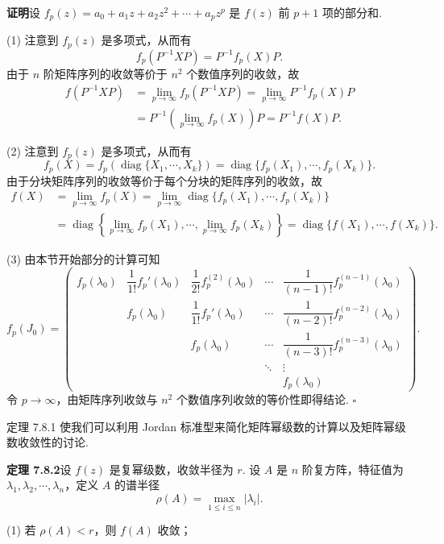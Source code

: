 \documentclass[UTF8, 12pt, fontset=fandol, oneside]{ctexart}
\begin{document}
\noindent\textbf{证明}\quad 设 $f_p(z)=a_0+a_1z+a_2z^2+\cdots+a_pz^p$ 是 $f(z)$ 前 $p+1$ 项的部分和.

(1) 注意到 $f_p(z)$ 是多项式，从而有
\[
f_p(P^{-1}XP)=P^{-1}f_p(X)P.
\]
由于 $n$ 阶矩阵序列的收敛等价于 $n^2$ 个数值序列的收敛，故
\[
\begin{aligned}
f(P^{-1}XP)&=\lim_{p\to\infty}f_p(P^{-1}XP)=\lim_{p\to\infty}P^{-1}f_p(X)P\\
&=P^{-1}\left(\lim_{p\to\infty}f_p(X)\right)P=P^{-1}f(X)P.
\end{aligned}
\]

(2) 注意到 $f_p(z)$ 是多项式，从而有
\[
f_p(X)=f_p(\operatorname{diag}\{X_1,\cdots,X_k\})=\operatorname{diag}\{f_p(X_1),\cdots,f_p(X_k)\}.
\]
由于分块矩阵序列的收敛等价于每个分块的矩阵序列的收敛，故
\[
\begin{aligned}
f(X)&=\lim_{p\to\infty}f_p(X)=\lim_{p\to\infty}\operatorname{diag}\{f_p(X_1),\cdots,f_p(X_k)\}\\
&=\operatorname{diag}\left\{\lim_{p\to\infty}f_p(X_1),\cdots,\lim_{p\to\infty}f_p(X_k)\right\}=\operatorname{diag}\{f(X_1),\cdots,f(X_k)\}.
\end{aligned}
\]

(3) 由本节开始部分的计算可知
\begin{equation}
f_p(J_0)=\left(\begin{array}{ccccc}
f_p(\lambda_0) & \dfrac1{1!}f_p'(\lambda_0) & \dfrac1{2!}f_p^{(2)}(\lambda_0) & \cdots & \dfrac1{(n-1)!}f_p^{(n-1)}(\lambda_0)\\
& f_p(\lambda_0) & \dfrac1{1!}f_p'(\lambda_0) & \cdots & \dfrac1{(n-2)!}f_p^{(n-2)}(\lambda_0)\\
& & f_p(\lambda_0) & \cdots & \dfrac1{(n-3)!}f_p^{(n-3)}(\lambda_0)\\
& & & \ddots & \vdots\\
& & & & f_p(\lambda_0)
\end{array}\right).
\tag{7.8.5}
\end{equation}
令 $p\to\infty$，由矩阵序列收敛与 $n^2$ 个数值序列收敛的等价性即得结论. $\square$

定理 7.8.1 使我们可以利用 Jordan 标准型来简化矩阵幂级数的计算以及矩阵幂级数收敛性的讨论.

\noindent\textbf{定理 7.8.2}\quad 设 $f(z)$ 是复幂级数，收敛半径为 $r$. 设 $A$ 是 $n$ 阶复方阵，特征值为 $\lambda_1,\lambda_2,\cdots,\lambda_n$，定义 $A$ 的谱半径
\[
\rho(A)=\max_{1\leq i\leq n}|\lambda_i|.
\]

(1) 若 $\rho(A)<r$，则 $f(A)$ 收敛；
\end{document}
